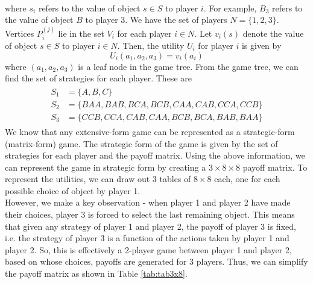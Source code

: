 \documentclass[9pt]{article}
\begin{document}
\vspace*{0pt} \\
where $s_{i}$ refers to the value of object $s \in S$ to player $i$.
For example, $B_{3}$ refers to the value of object $B$ to player 3.
We have the set of players $N = \{ 1, 2, 3 \}$.
Vertices $P_{i}^{(j)}$ lie in the set $V_{i}$ for each player $i \in N$.
Let $v_{i}(s)$ denote the value of object $s \in S$ to player $i \in N$.
Then, the utility $U_{i}$ for player $i$ is given by
\begin{equation}
    U_{i}(a_{1}, a_{2}, a_{3}) = v_{i}(a_{i})
\end{equation}
where $(a_{1}, a_{2}, a_{3})$ is a leaf node in the game tree.
From the game tree, we can find the set of strategies for each player.
These are
\begin{align}
    \begin{split}
        S_{1} &= \{ A, B, C \} \\
        S_{2} &= \{ BAA, BAB, BCA, BCB, CAA, CAB, CCA, CCB \} \\
        S_{3} &= \{ CCB, CCA, CAB, CAA, BCB, BCA, BAB, BAA \}
    \end{split}
\end{align}
We know that any extensive-form game can be represented as a strategic-form (matrix-form) game.
The strategic form of the game is given by the set of strategies for each player and the payoff matrix.
Using the above information, we can represent the game in strategic form by creating a $3 \times 8 \times 8$ payoff matrix.
To represent the utilities, we can draw out $3$ tables of $8 \times 8$ each, one for each possible choice of object by player 1. \\
However, we make a key observation - when player 1 and player 2 have made their choices, player 3 is forced to select the last remaining object.
This means that given any strategy of player 1 and player 2, the payoff of player 3 is fixed, i.e. the strategy of player 3 is a function of the actions taken by player 1 and player 2.
So, this is effectively a 2-player game between player 1 and player 2, based on whose choices, payoffs are generated for 3 players.
Thus, we can simplify the payoff matrix as shown in Table \ref{tab:tab3x8}.
\end{document}
